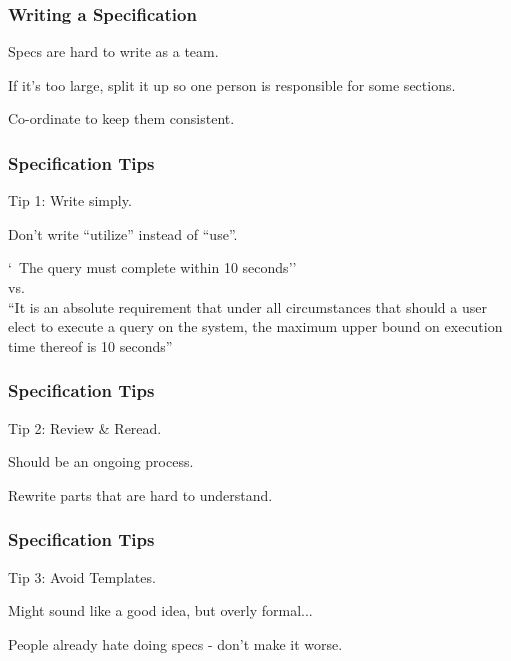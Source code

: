 \begin{frame}
\frametitle{Writing a Specification}

	\begin{changemargin}{1cm}
		Specs are hard to write as a team.
		
		If it's too large, split it up so one person is responsible for some sections.
		
		Co-ordinate to keep them consistent.
		
	\end{changemargin}
\end{frame}


\begin{frame}
\frametitle{Specification Tips}

	\begin{changemargin}{1cm}
		Tip 1: Write simply.
		
		Don't write ``utilize'' instead of ``use''.
		
		`~The query must complete within 10 seconds''\\vs.\\ ``It is an absolute requirement that under all circumstances that should a user elect to execute a query on the system, the maximum upper bound on execution time thereof is 10 seconds''
		
				
	\end{changemargin}
\end{frame}




\begin{frame}
\frametitle{Specification Tips}

	\begin{changemargin}{1cm}
		Tip 2: Review \& Reread.
		
		Should be an ongoing process.
		
		Rewrite parts that are hard to understand.		
				
	\end{changemargin}
\end{frame}


\begin{frame}
\frametitle{Specification Tips}

	\begin{changemargin}{1cm}
		Tip 3: Avoid Templates.
		
		Might sound like a good idea, but overly formal...
		
		People already hate doing specs - don't make it worse.		
				
	\end{changemargin}
\end{frame}

